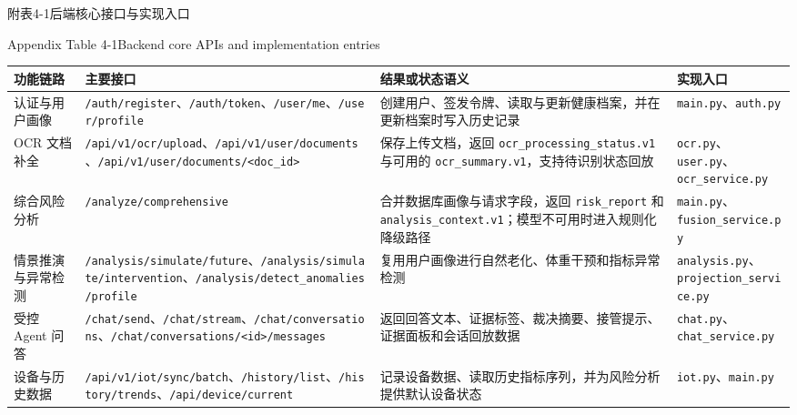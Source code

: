 \documentclass[UTF8, a4paper, 12pt, oneside]{ctexrep}
\numberwithin{equation}{chapter}
\newcommand{\codeid}[1]{{\begingroup\urlstyle{rm}\nolinkurl{#1}\endgroup}}
\begin{document}
{\vspace{0.5\baselineskip}
\begin{center}
{\songti{}附表4-1\quad 后端核心接口与实现入口\par}
{\rmfamily{}Appendix Table 4-1\quad Backend core APIs and implementation entries\par}
\end{center}
\vspace{-0.5\baselineskip}
{\songti{}
\noindent\begin{tabular}{@{}>{\raggedright\arraybackslash}p{} >{\raggedright\arraybackslash}p{} >{\raggedright\arraybackslash}p{} >{\raggedright\arraybackslash}p{}@{}}
\toprule
功能链路 & 主要接口 & 结果或状态语义 & 实现入口 \\
\midrule
认证与用户画像 & \codeid{/auth/register}、\codeid{/auth/token}、\codeid{/user/me}、\codeid{/user/profile} & 创建用户、签发令牌、读取与更新健康档案，并在更新档案时写入历史记录 & \codeid{main.py}、\codeid{auth.py} \\
OCR 文档补全 & \codeid{/api/v1/ocr/upload}、\codeid{/api/v1/user/documents}、\codeid{/api/v1/user/documents/<doc_id>} & 保存上传文档，返回 \codeid{ocr_processing_status.v1} 与可用的 \codeid{ocr_summary.v1}，支持待识别状态回放 & \codeid{ocr.py}、\codeid{user.py}、\codeid{ocr_service.py} \\
综合风险分析 & \codeid{/analyze/comprehensive} & 合并数据库画像与请求字段，返回 \codeid{risk_report} 和 \codeid{analysis_context.v1}；模型不可用时进入规则化降级路径 & \codeid{main.py}、\codeid{fusion_service.py} \\
情景推演与异常检测 & \codeid{/analysis/simulate/future}、\codeid{/analysis/simulate/intervention}、\codeid{/analysis/detect_anomalies/profile} & 复用用户画像进行自然老化、体重干预和指标异常检测 & \codeid{analysis.py}、\codeid{projection_service.py} \\
受控 Agent 问答 & \codeid{/chat/send}、\codeid{/chat/stream}、\codeid{/chat/conversations}、\codeid{/chat/conversations/<id>/messages} & 返回回答文本、证据标签、裁决摘要、接管提示、证据面板和会话回放数据 & \codeid{chat.py}、\codeid{chat_service.py} \\
设备与历史数据 & \codeid{/api/v1/iot/sync/batch}、\codeid{/history/list}、\codeid{/history/trends}、\codeid{/api/device/current} & 记录设备数据、读取历史指标序列，并为风险分析提供默认设备状态 & \codeid{iot.py}、\codeid{main.py} \\
\bottomrule
\end{tabular}
}

}
\end{document}
